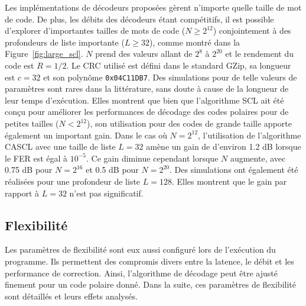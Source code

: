 Les implémentations de décodeurs proposées gèrent n'importe quelle taille de mot de code. De plus, les débits des décodeurs étant compétitifs, il est possible d'explorer d'importantes tailles de mots de code ($N\geq2^{12}$) conjointement à des profondeurs de liste importante ($L \geq 32$), comme montré dans la Figure~\ref{fig:large_scl}. $N$ prend des valeurs allant de $2^8$ à $2^{20}$ et le rendement du code est $R=1/2$. Le CRC utilisé est défini dans le standard GZip, sa longueur est $c=32$ et son polynôme \texttt{0x04C11DB7}. Des simulations pour de telle valeurs de paramètres sont rares dans la littérature, sans doute à cause de la longueur de leur temps d'exécution. Elles montrent que bien que l'algorithme SCL ait été conçu pour améliorer les performances de décodage des codes polaires pour de petites tailles ($N<2^{12}$), son utilisation pour des codes de grande taille apporte également un important gain. Dans le cas où $N=2^{12}$, l'utilisation de l'algorithme CASCL avec une taille de liste $L=32$ amène un gain de d'environ 1.2 dB lorsque le FER est égal à $10^{-5}$. Ce gain diminue cependant lorsque $N$ augmente, avec 0.75 dB pour $N=2^{16}$ et 0.5 dB pour $N=2^{20}$. Des simulations ont également été réalisées pour une profondeur de liste $L=128$. Elles montrent que le gain par rapport à $L=32$ n'est pas significatif.

\subsection{Flexibilité}
Les paramètres de flexibilité sont eux aussi configuré lors de l'exécution du programme. Ils permettent des compromis divers entre la latence, le débit et les performance de correction. Ainsi, l'algorithme de décodage peut être ajusté finement pour un code polaire donné. Dans la suite, ces paramètres de flexibilité sont détaillés et leurs effets analysés.

